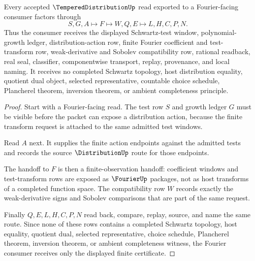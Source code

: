 \begin{theorem}
\label{thm:tempered-distribution-fourier-handoff}
Every accepted $\TemperedDistributionUp$ read exported to a Fourier-facing consumer factors through
$$
S,G,A\longmapsto F\longmapsto W,Q,E\longmapsto L,H,C,P,N .
$$
Thus the consumer receives the displayed Schwartz-test window, polynomial-growth ledger, distribution-action row, finite Fourier coefficient and test-transform row, weak-derivative and Sobolev compatibility row, rational readback, real seal, classifier, componentwise transport, replay, provenance, and local naming. It receives no completed Schwartz topology, host distribution equality, quotient dual object, selected representative, countable choice schedule, Plancherel theorem, inversion theorem, or ambient completeness principle.
\end{theorem}
\begin{proof}
Start with a Fourier-facing read. The test row $S$ and growth ledger $G$ must be visible before the packet can expose a distribution action, because the finite transform request is attached to the same admitted test windows.

Read $A$ next. It supplies the finite action endpoints against the admitted tests and records the source $\DistributionUp$ route for those endpoints.

The handoff to $F$ is then a finite-observation handoff: coefficient windows and test-transform rows are exposed as $\FourierUp$ packages, not as host transforms of a completed function space. The compatibility row $W$ records exactly the weak-derivative signs and Sobolev comparisons that are part of the same request.

Finally $Q,E,L,H,C,P,N$ read back, compare, replay, source, and name the same route. Since none of these rows contains a completed Schwartz topology, host equality, quotient dual, selected representative, choice schedule, Plancherel theorem, inversion theorem, or ambient completeness witness, the Fourier consumer receives only the displayed finite certificate.
\end{proof}



